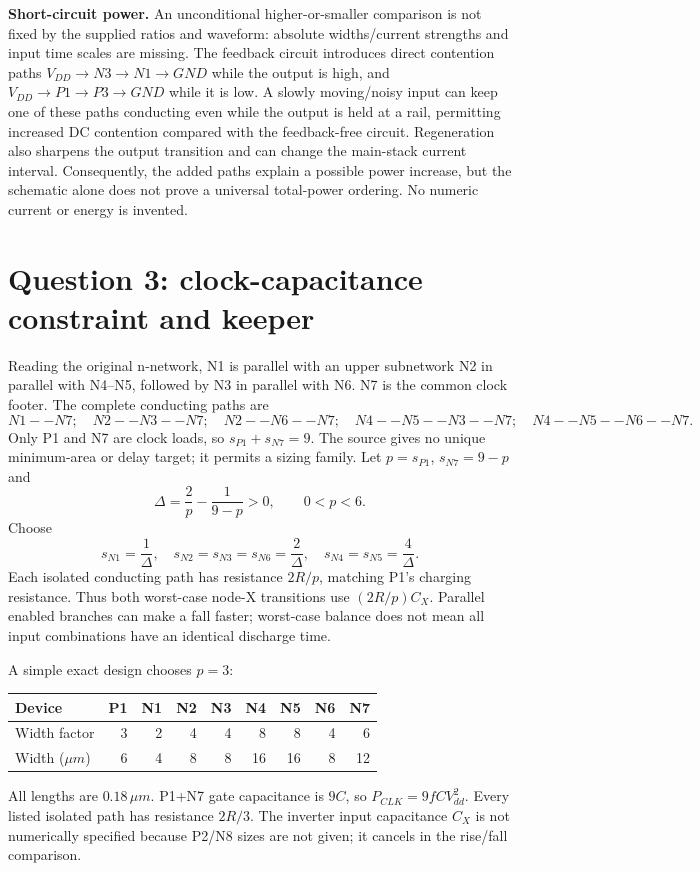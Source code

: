 \documentclass[10pt]{article}
\begin{document}
\textbf{Short-circuit power.} An unconditional higher-or-smaller comparison is not fixed by the supplied ratios and waveform: absolute widths/current strengths and input time scales are missing. The feedback circuit introduces direct contention paths $V_{DD}\to N3\to N1\to GND$ while the output is high, and $V_{DD}\to P1\to P3\to GND$ while it is low. A slowly moving/noisy input can keep one of these paths conducting even while the output is held at a rail, permitting increased DC contention compared with the feedback-free circuit. Regeneration also sharpens the output transition and can change the main-stack current interval. Consequently, the added paths explain a possible power increase, but the schematic alone does not prove a universal total-power ordering. No numeric current or energy is invented.
\newpage
\section*{Question 3: clock-capacitance constraint and keeper}
Reading the original n-network, N1 is parallel with an upper subnetwork N2 in parallel with N4--N5, followed by N3 in parallel with N6. N7 is the common clock footer. The complete conducting paths are
\[N1--N7;\quad N2--N3--N7;\quad N2--N6--N7;\quad
N4--N5--N3--N7;\quad N4--N5--N6--N7.\]
Only P1 and N7 are clock loads, so $s_{P1}+s_{N7}=9$. The source gives no unique minimum-area or delay target; it permits a sizing family. Let $p=s_{P1}$, $s_{N7}=9-p$ and
\[\Delta=\frac2p-\frac1{9-p}>0,\qquad 0<p<6.\]
Choose
\[s_{N1}=\frac1\Delta,\quad s_{N2}=s_{N3}=s_{N6}=\frac2\Delta,
\quad s_{N4}=s_{N5}=\frac4\Delta.\]
Each isolated conducting path has resistance $2R/p$, matching P1's charging resistance. Thus both worst-case node-X transitions use $(2R/p)C_X$. Parallel enabled branches can make a fall faster; worst-case balance does not mean all input combinations have an identical discharge time.

A simple exact design chooses $p=3$:
\begin{center}\begin{tabular}{lrrrrrrrr}\toprule
Device&P1&N1&N2&N3&N4&N5&N6&N7\\\midrule
Width factor&3&2&4&4&8&8&4&6\\
Width ($\mu m$)&6&4&8&8&16&16&8&12\\\bottomrule
\end{tabular}\end{center}
All lengths are $0.18\,\mu m$. P1+N7 gate capacitance is $9C$, so $P_{CLK}=9fCV_{dd}^{2}$. Every listed isolated path has resistance $2R/3$. The inverter input capacitance $C_X$ is not numerically specified because P2/N8 sizes are not given; it cancels in the rise/fall comparison.
\end{document}
